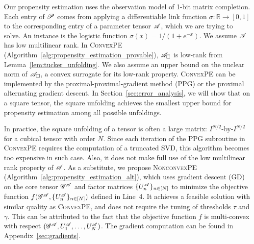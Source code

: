 \documentclass{article}
\newcommand{\T}[2][]{#1\mathscr{\MakeUppercase{#2}}}
\newcommand{\RR}{\mathbb{R}}
\theoremstyle{plain}
\begin{document}
Our propensity estimation uses the observation model of 1-bit matrix completion. 
Each entry of $\T{P}$ comes from applying a differentiable link function $\sigma: \RR \rightarrow [0, 1]$ to the corresponding entry of a parameter tensor $\T{A}$, which we are trying to solve.
An instance is the logistic function $\sigma(x)=1/(1+e^{-x})$.
We assume $\T{A}$ has low multilinear rank.
In \textsc{ConvexPE} (Algorithm~\ref{alg:propensity_estimation_provable}), $\T{A}_\square$ is low-rank from Lemma~\ref{lem:tucker_unfolding}.
We also assume an upper bound on the nuclear norm of $\T{A}_\square$, a convex surrogate for its low-rank property.
\textsc{ConvexPE} can be implemented by the proximal-proximal-gradient method (PPG) \cite{ryu2017proximal} or the proximal alternating gradient descent.
In Section~\ref{sec:error_analysis}, we will show that on a square tensor, the square unfolding achieves the smallest upper bound for propensity estimation among all possible unfoldings.

In practice, the square unfolding of a tensor is often a large matrix: $I^{N/2}$-by-$I^{N/2}$ for a cubical tensor with order $N$. 
Since each iteration of the PPG subroutine in \textsc{ConvexPE} requires the computation of a truncated SVD, this algorithm becomes too expensive in such case.
Also, it does not make full use of the low multilinear rank property of $\T{A}$. 
As a substitute, we propose \textsc{NonconvexPE} (Algorithm~\ref{alg:propensity_estimation_alt}), which uses gradient descent (GD) on the core tensor $\T{G}^{\T{A}}$ and factor matrices $\{U_n^{\T{A}}\}_{n \in [N]}$ to minimize the objective function $f (\T{G}^{\T{A}}, \{U_n^{\T{A}}\}_{n \in [N]})$ defined in Line~4. 
It achieves a feasible solution with similar quality as \textsc{ConvexPE}, and does not require the tuning of thresholds $\tau$ and $\gamma$. 
This can be attributed to the fact that the objective function $f$ is multi-convex with respect $(\T{G}^{\T{A}}, U_1^{\T{A}}, \ldots, U_N^{\T{A}})$. 
The gradient computation can be found in Appendix~\ref{sec:gradients}. 
\end{document}

